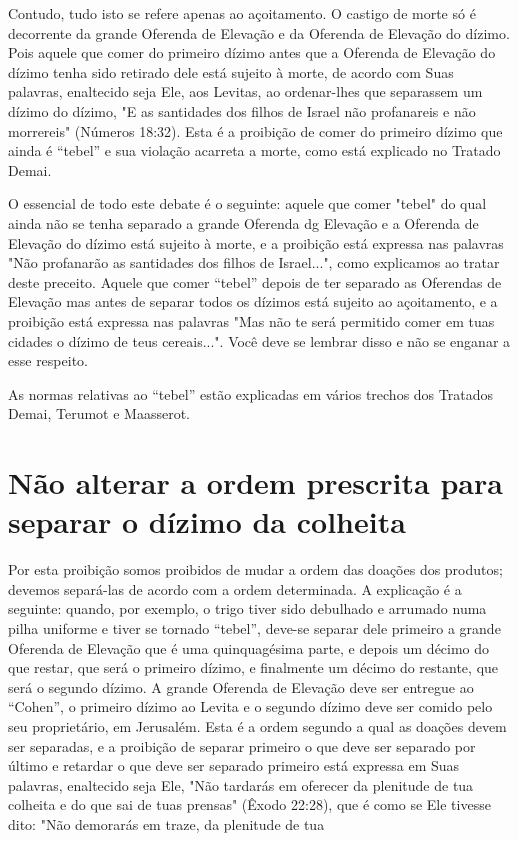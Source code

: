 Contudo, tudo isto se refere apenas ao açoitamento. O castigo de morte
só é decorrente da grande Oferenda de Elevação e da Oferenda de
Ele­vação do dízimo. Pois aquele que comer do primeiro dízimo antes que
a Ofe­renda de Elevação do dízimo tenha sido retirado dele está sujeito
à morte, de acordo com Suas palavras, enaltecido seja Ele, aos Levitas,
ao ordenar-lhes que separassem um dízimo do dízimo, "E as santidades dos
filhos de Israel não pro­fanareis e não morrereis" (Números 18:32). Esta
é a proibição de comer do pri­meiro dízimo que ainda é ``tebel'' e sua
violação acarreta a morte, como está explicado no Tratado Demai.

O essencial de todo este debate é o seguinte: aquele que comer "te­bel"
do qual ainda não se tenha separado a grande Oferenda dg Elevação e a
Oferenda de Elevação do dízimo está sujeito à morte, e a proibição está
expres­sa nas palavras "Não profanarão as santidades dos filhos de
Israel...", como ex­plicamos ao tratar deste preceito. Aquele que comer
``tebel'' depois de ter se­parado as Oferendas de Elevação mas antes de
separar todos os dízimos está sujeito ao açoitamento, e a proibição está
expressa nas palavras "Mas não te será permitido comer em tuas cidades o
dízimo de teus cereais...". Você deve se lembrar disso e não se enganar
a esse respeito.

As normas relativas ao ``tebel'' estão explicadas em vários trechos dos
Tratados Demai, Terumot e Maasserot.

\section{Não alterar a ordem prescrita para separar o dízimo da colheita}

Por esta proibição somos proibidos de mudar a ordem das doações dos
produtos; devemos separá-las de acordo com a ordem determinada. A
ex­plicação é a seguinte: quando, por exemplo, o trigo tiver sido
debulhado e ar­rumado numa pilha uniforme e tiver se tornado ``tebel'',
deve-se separar dele primeiro a grande Oferenda de Elevação que é uma
quinquagésima parte, e de­pois um décimo do que restar, que será o
primeiro dízimo, e finalmente um décimo do restante, que será o segundo
dízimo. A grande Oferenda de Eleva­ção deve ser entregue ao ``Cohen'', o
primeiro dízimo ao Levita e o segundo dízimo deve ser comido pelo seu
proprietário, em Jerusalém. Esta é a ordem segundo a qual as doações
devem ser separadas, e a proibição de separar pri­meiro o que deve ser
separado por último e retardar o que deve ser separado primeiro está
expressa em Suas palavras, enaltecido seja Ele, "Não tardarás em
oferecer da plenitude de tua colheita e do que sai de tuas prensas"
(Êxodo 22:28), que é como se Ele tivesse dito: "Não demorarás em traze,
da plenitude de tua


